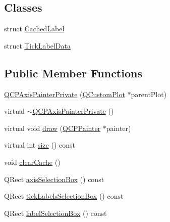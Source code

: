 \subsection*{Classes}
\begin{DoxyCompactItemize}
\item 
struct \hyperlink{struct_q_c_p_axis_painter_private_1_1_cached_label}{Cached\+Label}
\item 
struct \hyperlink{struct_q_c_p_axis_painter_private_1_1_tick_label_data}{Tick\+Label\+Data}
\end{DoxyCompactItemize}
\subsection*{Public Member Functions}
\begin{DoxyCompactItemize}
\item 
\hyperlink{class_q_c_p_axis_painter_private_a0f14aa5c4aa83dbcd68984a7c73bf94f}{Q\+C\+P\+Axis\+Painter\+Private} (\hyperlink{class_q_custom_plot}{Q\+Custom\+Plot} $\ast$parent\+Plot)
\item 
virtual \hyperlink{class_q_c_p_axis_painter_private_a7c7f95313f0f78c3c3975f822a5fea35}{$\sim$\+Q\+C\+P\+Axis\+Painter\+Private} ()
\item 
virtual void \hyperlink{class_q_c_p_axis_painter_private_a0207a99bdf9c4f70af20928898ddc2fc}{draw} (\hyperlink{class_q_c_p_painter}{Q\+C\+P\+Painter} $\ast$painter)
\item 
virtual int \hyperlink{class_q_c_p_axis_painter_private_a8b2dc0bd2ccbf6bd450733ec9e410a38}{size} () const 
\item 
void \hyperlink{class_q_c_p_axis_painter_private_a7b6806e32c44384fd0ae4dcdaa72b1b5}{clear\+Cache} ()
\item 
Q\+Rect \hyperlink{class_q_c_p_axis_painter_private_aaf93529ac60215ea020cdff5635c3e80}{axis\+Selection\+Box} () const 
\item 
Q\+Rect \hyperlink{class_q_c_p_axis_painter_private_af02fc189ab8460c202eb4138c9aca516}{tick\+Labels\+Selection\+Box} () const 
\item 
Q\+Rect \hyperlink{class_q_c_p_axis_painter_private_ae907476bf8cf0ecd17620575e17c06b1}{label\+Selection\+Box} () const 
\end{DoxyCompactItemize}
